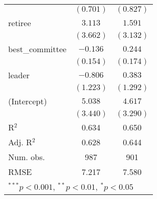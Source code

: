 \documentclass[12pt]{article}
\begin{document}
\begin{table}
\begin{center}
\begin{tabular}{l c c }
			& $(0.701)$      & $(0.827)$      \\
			retiree                  & $3.113$        & $1.591$        \\
			& $(3.662)$      & $(3.132)$      \\
			best\_committee          & $-0.136$       & $0.244$        \\
			& $(0.154)$      & $(0.174)$      \\
			leader                   & $-0.806$       & $0.383$        \\
			& $(1.223)$      & $(1.292)$      \\
			(Intercept)              & $5.038$        & $4.617$        \\
			& $(3.440)$      & $(3.290)$      \\
			\hline
			R$^2$                    & 0.634          & 0.650          \\
			Adj. R$^2$               & 0.628          & 0.644          \\
			Num. obs.                & 987            & 901            \\
			RMSE                     & 7.217          & 7.580          \\
			\hline
			\multicolumn{3}{l}{\scriptsize{$^{***}p<0.001$, $^{**}p<0.01$, $^*p<0.05$}}
		\end{tabular}
	\end{center}
\end{table}
\end{document}
